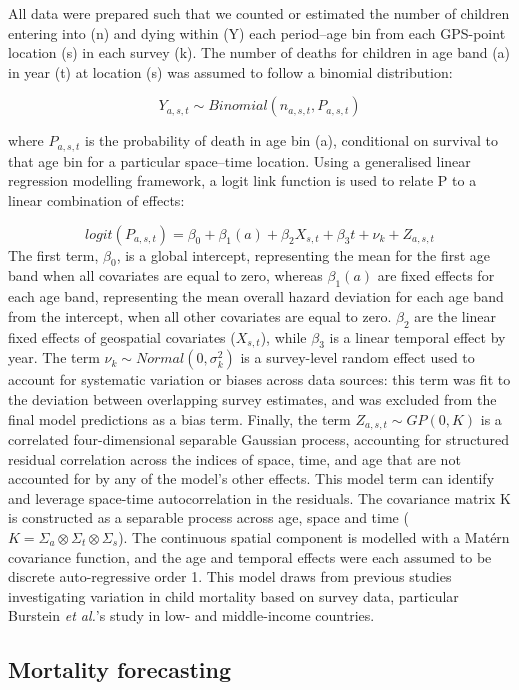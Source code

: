 \documentclass[
]{report}
\begin{document}
All data were prepared such that we counted or estimated the number of children entering into (n) and dying within (Y) each period--age bin from each GPS-point location (s) in each survey (k). The number of deaths for children in age band (a) in year (t) at location (s) was assumed to follow a binomial distribution:

\[Y_{a,s,t} \sim Binomial(n_{a,s,t}, P_{a,s,t})\]

where \(P_{a,s,t}\) is the probability of death in age bin (a), conditional on survival to that age bin for a particular space--time location. Using a generalised linear regression modelling framework, a logit link function is used to relate P to a linear combination of effects:

\[logit(P_{a,s,t})=\beta_0 + \beta_1(a) + \beta_2X_{s,t} + \beta_3t + \nu_{k} + Z_{a,s,t} \]
The first term, \(\beta_0\), is a global intercept, representing the mean for the first age band when all covariates are equal to zero, whereas \(\beta_1(a)\) are fixed effects for each age band, representing the mean overall hazard deviation for each age band from the intercept, when all other covariates are equal to zero. \(\beta_2\) are the linear fixed effects of geospatial covariates (\(X_{s,t}\)), while \(\beta_3\) is a linear temporal effect by year. The term \(\nu_k \sim Normal(0,\sigma^2_k)\) is a survey-level random effect used to account for systematic variation or biases across data sources: this term was fit to the deviation between overlapping survey estimates, and was excluded from the final model predictions as a bias term. Finally, the term \(Z_{a,s,t} \sim GP(0, K)\) is a correlated four-dimensional separable Gaussian process, accounting for structured residual correlation across the indices of space, time, and age that are not accounted for by any of the model's other effects. This model term can identify and leverage space-time autocorrelation in the residuals. The covariance matrix K is constructed as a separable process across age, space and time (\(K = \Sigma_a \otimes \Sigma_t \otimes \Sigma_s\)). The continuous spatial component is modelled with a Matérn covariance function, and the age and temporal effects were each assumed to be discrete auto-regressive order 1. This model draws from previous studies investigating variation in child mortality based on survey data, particular Burstein \emph{et al.}'s study in low- and middle-income countries.\autocite{Burstein2019,Wakefield2019}

\hypertarget{mortality-forecasting}{%
\subsection{Mortality forecasting}\label{mortality-forecasting}}
\end{document}
